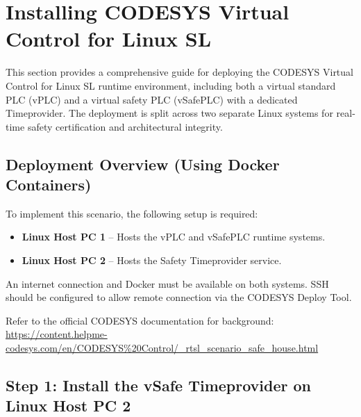 \documentclass[a4paper,12pt]{article}
\begin{document}
\section{Installing CODESYS Virtual Control for Linux SL}

This section provides a comprehensive guide for deploying the CODESYS Virtual Control for Linux SL runtime environment, including both a virtual standard PLC (vPLC) and a virtual safety PLC (vSafePLC) with a dedicated Timeprovider. The deployment is split across two separate Linux systems for real-time safety certification and architectural integrity.

\subsection{Deployment Overview (Using Docker Containers)}

To implement this scenario, the following setup is required:

\begin{itemize}
	\item \textbf{Linux Host PC 1} – Hosts the vPLC and vSafePLC runtime systems.
	\item \textbf{Linux Host PC 2} – Hosts the Safety Timeprovider service.
\end{itemize}

An internet connection and Docker must be available on both systems. SSH should be configured to allow remote connection via the CODESYS Deploy Tool.

\vspace{0.5em}
Refer to the official CODESYS documentation for background:
\url{https://content.helpme-codesys.com/en/CODESYS%20Control/_rtsl_scenario_safe_house.html}

\subsection*{Step 1: Install the vSafe Timeprovider on Linux Host PC 2}
\end{document}
